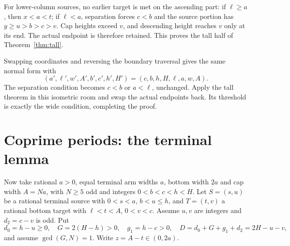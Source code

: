 \documentclass[11pt]{article}
\theoremstyle{definition}
\begin{document}
For lower-column sources, no earlier target is met on the ascending part: if $\ell\ge a$, then $x<a<t$; if $\ell<a$, separation forces $c<b$ and the source portion has $y\ge u>b>c>v$. Cap heights exceed $v$, and descending height reaches $v$ only at its end. The actual endpoint is therefore retained. This proves the tall half of Theorem~\ref{thm:tall}.

Swapping coordinates and reversing the boundary traversal gives the same normal form with
\[
 (a',\ell',w',A',b',c',h',H')=(c,b,h,H,\ell,a,w,A).
\]
The separation condition becomes $c<b$ or $a<\ell$, unchanged. Apply the tall theorem in this isometric room and swap the actual endpoints back. Its threshold is exactly the wide condition, completing the proof.

\section{Coprime periods: the terminal lemma}
Now take rational $a>0$, equal terminal arm widths $a$, bottom width $2a$ and cap width $A=Na$, with $N\ge5$ odd and integers $0<b<c<h<H$. Let $S=(s,u)$ be a rational terminal source with $0<s<a$, $b<u\le h$, and $T=(t,v)$ a rational bottom target with $\ell<t<A$, $0<v<c$. Assume $u,v$ are integers and $d_2=c-v$ is odd. Put
\[
 d_0=h-u\ge0,\quad G=2(H-h)>0,\quad g_1=h-c>0,\quad
 D=d_0+G+g_1+d_2=2H-u-v,
\]
and assume $\gcd(G,N)=1$. Write $z=A-t\in(0,2a)$.
\end{document}

